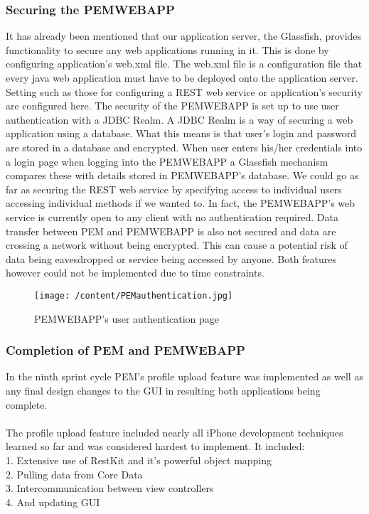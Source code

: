 \documentclass[12pt, a4paper]{report}   %
\begin{document}
\begin{enumerate}
\subsubsection{Securing the PEMWEBAPP}
It has already been mentioned that our application server, the Glassfish, provides functionality to secure any web applications running in it. This is done by configuring application's web.xml file. The web.xml file is a configuration file that every java web application must have to be deployed onto the application server. Setting such as those for configuring a REST web service or application's security are configured here. The security of the PEMWEBAPP is set up to use user authentication with a JDBC Realm. A JDBC Realm is a way of securing a web application using a database. What this means is that user's login and password are stored in a database and encrypted. When user enters his/her credentials into a login page when logging into the PEMWEBAPP a Glassfish mechanism compares these with details stored in PEMWEBAPP's database.
We could go as far as securing the REST web service by specifying access to individual users accessing individual methods if we wanted to. In fact, the PEMWEBAPP's web service is currently open to any client with no authentication required. Data transfer between PEM and PEMWEBAPP is also not secured and data are crossing a network without being encrypted. This can cause a potential risk of data being eavesdropped or service being accessed by anyone. Both features however could not be implemented due to time constraints.


\begin{figure}[H]
  \centering
	\texttt{[image: /content/PEMauthentication.jpg]}
	  \caption{PEMWEBAPP's user authentication page}
\end{figure}



\subsubsection{Completion of PEM and PEMWEBAPP}
In the ninth sprint cycle PEM's profile upload feature was implemented as well as any final design changes to the GUI in resulting both applications being complete.\\ \\

The profile upload feature included nearly all iPhone development techniques learned so far and was considered hardest to implement. It included:\\
1.	Extensive use of RestKit and it's powerful object mapping\\
2.	Pulling data from Core Data\\
3.	Intercommunication between view controllers\\
4.	And updating GUI\\ \\


\end{enumerate}
\end{document}

